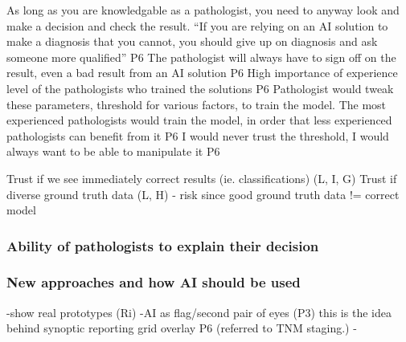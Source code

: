 As long as you are knowledgable as a pathologist, you need to anyway look and make a decision and check the result. “If you are relying on an AI solution to make a diagnosis that you cannot, you should give up on diagnosis and ask someone more qualified” P6
The pathologist will always have to sign off on the result, even a bad result from an AI solution P6
High importance of experience level of the pathologists who trained the solutions P6
Pathologist would tweak these parameters, threshold for various factors, to train the model. The most experienced pathologists would train the model, in order that less experienced pathologists can benefit from it P6
I would never trust the threshold, I would always want to be able to manipulate it P6

Trust if we see immediately correct results (ie. classifications) (L, I, G)
Trust if diverse ground truth data (L, H) - risk since good ground truth data != correct model

\subsubsection{Ability of pathologists to explain their decision}

\subsubsection{New approaches and how AI should be used}
-show real prototypes (Ri)
-AI as flag/second pair of eyes (P3) this is the idea behind synoptic reporting grid overlay P6 (referred to TNM staging.)
-

